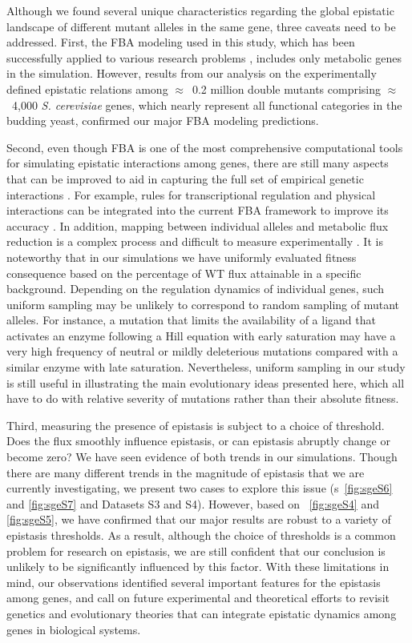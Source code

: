 Although we found several unique characteristics regarding the global
epistatic landscape of different mutant alleles in the same gene,
three caveats need to be addressed. First, the FBA modeling used in
this study, which has been successfully applied to various research
problems \citep{Papp2004, Ibarra2002, Harrison2007, Deutscher2006,
Segre2005, He2010}, includes only metabolic genes in the
simulation. However, results from our analysis on the experimentally
defined epistatic relations among $\approx$~0.2 million double mutants
comprising $\approx$~4,000 \textit{S. cerevisiae} genes, which nearly
represent all functional categories in the budding yeast, confirmed
our major FBA modeling predictions.

Second, even though FBA is one of the most comprehensive computational
tools for simulating epistatic interactions among genes, there are
still many aspects that can be improved to aid in capturing the full
set of empirical genetic interactions \citep{Covert2001}. For example, rules for
transcriptional regulation and physical interactions can be integrated
into the current FBA framework to improve its accuracy \citep{Szappanos2011}. In
addition, mapping between individual alleles and metabolic flux
reduction is a complex process and difficult to measure experimentally
\citep{Banta2007}. It is noteworthy that in our simulations we have uniformly
evaluated fitness consequence based on the percentage of WT flux
attainable in a specific background. Depending on the regulation
dynamics of individual genes, such uniform sampling may be unlikely to
correspond to random sampling of mutant alleles. For instance, a
mutation that limits the availability of a ligand that activates an
enzyme following a Hill equation with early saturation may have a very
high frequency of neutral or mildly deleterious mutations compared
with a similar enzyme with late saturation. Nevertheless, uniform
sampling in our study is still useful in illustrating the main
evolutionary ideas presented here, which all have to do with relative
severity of mutations rather than their absolute fitness.

Third, measuring the presence of epistasis is subject to a choice of
threshold. Does the flux smoothly influence epistasis, or can
epistasis abruptly change or become zero? We have seen evidence of
both trends in our simulations. Though there are many different trends
in the magnitude of epistasis that we are currently investigating, we
present two cases to explore this issue (\Fig s~\ref{fig:sgeS6} and
\ref{fig:sgeS7} and Datasets S3 and S4). However, based on
\Fig~\ref{fig:sgeS4} and \ref{fig:sgeS5}, we have confirmed that our
major results are robust to a variety of epistasis thresholds. As
a result, although the choice of thresholds is a common problem for
research on epistasis, we are still confident that our conclusion is
unlikely to be significantly influenced by this factor. With these
limitations in mind, our observations identified several important
features for the epistasis among genes, and call on future
experimental and theoretical efforts to revisit genetics and
evolutionary theories that can integrate epistatic dynamics among
genes in biological systems.

